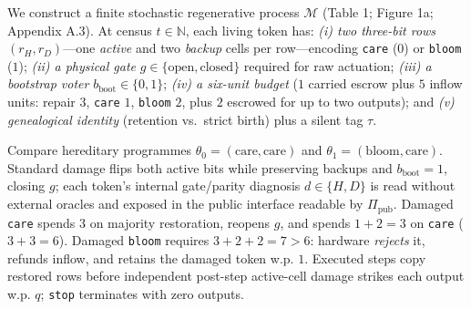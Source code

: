 \documentclass[12pt,letterpaper]{article}
\begin{document}
We construct a finite stochastic regenerative process \(\mathcal{M}\)
(Table 1; Figure 1a; Appendix A.3). At census \(t \in \mathbb{N}\), each
living token has: \emph{(i) two three-bit rows} \((r_H, r_D)\)---one
\emph{active} and two \emph{backup} cells per row---encoding
\texttt{care} (\(0\)) or \texttt{bloom} (\(1\)); \emph{(ii) a physical
gate} \(g \in \{\mathrm{open}, \mathrm{closed}\}\) required for raw
actuation; \emph{(iii) a bootstrap voter}
\(b_{\mathrm{boot}} \in \{0,1\}\); \emph{(iv) a six-unit budget} (\(1\)
carried escrow plus \(5\) inflow units: repair \(3\), \texttt{care}
\(1\), \texttt{bloom} \(2\), plus \(2\) escrowed for up to two outputs);
and \emph{(v) genealogical identity} (retention vs.~strict birth) plus a
silent tag \(\tau\).

Compare hereditary programmes
\(\theta_0 = (\mathrm{care}, \mathrm{care})\) and
\(\theta_1 = (\mathrm{bloom}, \mathrm{care})\). Standard damage flips
both active bits while preserving backups and \(b_{\mathrm{boot}}=1\),
closing \(g\); each token's internal gate/parity diagnosis
\(d \in \{H, D\}\) is read without external oracles and exposed in the
public interface readable by \(\Pi_{\mathrm{pub}}\). Damaged
\texttt{care} spends \(3\) on majority restoration, reopens \(g\), and
spends \(1+2=3\) on \texttt{care} (\(3+3=6\)). Damaged \texttt{bloom}
requires \(3+2+2=7 > 6\): hardware \emph{rejects} it, refunds inflow,
and retains the damaged token w.p. \(1\). Executed steps copy restored
rows before independent post-step active-cell damage strikes each output
w.p. \(q\); \texttt{stop} terminates with zero outputs.

\end{document}
